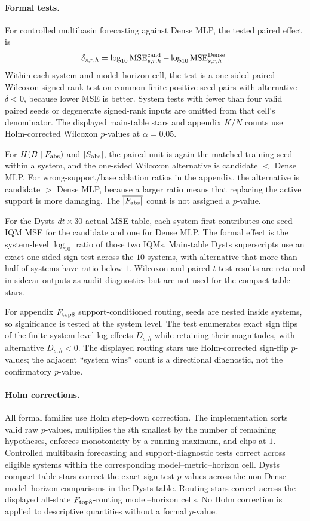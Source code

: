 \paragraph{Formal tests.}
For controlled multibasin forecasting against Dense MLP, the tested paired effect is
\[
  \delta_{s,r,h}
  =
  \log_{10}\operatorname{MSE}^{\rm cand}_{s,r,h}
  -
  \log_{10}\operatorname{MSE}^{\rm Dense}_{s,r,h}.
\]
Within each system and model--horizon cell, the test is a one-sided paired Wilcoxon signed-rank test on common finite positive seed pairs with alternative \(\delta<0\), because lower MSE is better. System tests with fewer than four valid paired seeds or degenerate signed-rank inputs are omitted from that cell's denominator. The displayed main-table stars and appendix \(K/N\) counts use Holm-corrected Wilcoxon \(p\)-values at \(\alpha=0.05\).

For \(H(B\mid F_{\rm abs})\) and \(|S_{\rm abs}|\), the paired unit is again the matched training seed within a system, and the one-sided Wilcoxon alternative is candidate \(<\) Dense MLP. For wrong-support/base ablation ratios in the appendix, the alternative is candidate \(>\) Dense MLP, because a larger ratio means that replacing the active support is more damaging. The \(\overline{|F_{\rm abs}|}\) count is not assigned a \(p\)-value.

For the Dysts \(dt{\times}30\) actual-MSE table, each system first contributes one seed-IQM MSE for the candidate and one for Dense MLP. The formal effect is the system-level \(\log_{10}\) ratio of those two IQMs. Main-table Dysts superscripts use an exact one-sided sign test across the \(10\) systems, with alternative that more than half of systems have ratio below \(1\). Wilcoxon and paired \(t\)-test results are retained in sidecar outputs as audit diagnostics but are not used for the compact table stars.

For appendix \(F_{\rm top8}\) support-conditioned routing, seeds are nested inside systems, so significance is tested at the system level. The test enumerates exact sign flips of the finite system-level log effects \(D_{s,h}\) while retaining their magnitudes, with alternative \(D_{s,h}<0\). The displayed routing stars use Holm-corrected sign-flip \(p\)-values; the adjacent ``system wins'' count is a directional diagnostic, not the confirmatory \(p\)-value.

\paragraph{Holm corrections.}
All formal families use Holm step-down correction. The implementation sorts valid raw \(p\)-values, multiplies the \(i\)th smallest by the number of remaining hypotheses, enforces monotonicity by a running maximum, and clips at \(1\). Controlled multibasin forecasting and support-diagnostic tests correct across eligible systems within the corresponding model--metric--horizon cell. Dysts compact-table stars correct the exact sign-test \(p\)-values across the non-Dense model--horizon comparisons in the Dysts table. Routing stars correct across the displayed all-state \(F_{\rm top8}\)-routing model--horizon cells. No Holm correction is applied to descriptive quantities without a formal \(p\)-value.


